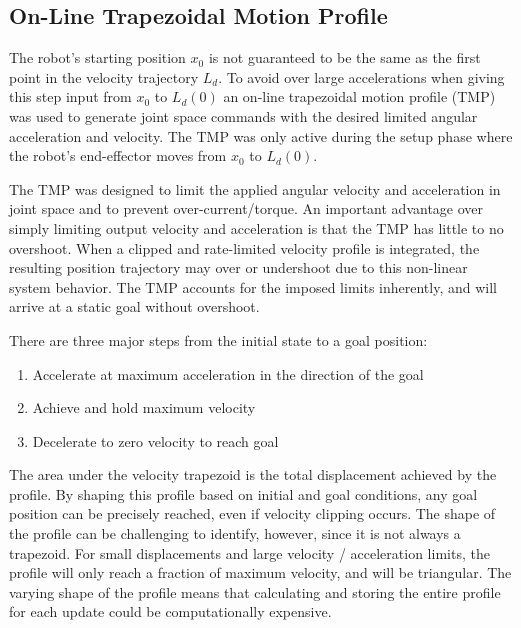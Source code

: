 \subsection{On-Line Trapezoidal Motion Profile}

The robot's starting position $x_0$ is not guaranteed to be the same as the
first point in the velocity trajectory $L_d$.  To avoid over large
accelerations when giving this step input from $x_0$ to $L_d(0)$ an on-line
trapezoidal motion profile (TMP) was used to generate joint space commands with
the desired limited angular acceleration and velocity.  The TMP was only active
during the setup phase where the robot's end-effector moves from $x_0$ to
$L_d(0)$.

The TMP was designed to limit the applied angular velocity and acceleration in
joint space and to prevent over-current/torque. An important advantage over
simply limiting output velocity and acceleration is that the TMP has little to
no overshoot. When a clipped and rate-limited velocity profile is integrated,
the resulting position trajectory may over or undershoot due to this non-linear
system behavior.  The TMP accounts for the imposed limits inherently, and will
arrive at a static goal without overshoot.

There are three major steps from the initial state to a goal position:

\begin{enumerate}
\item Accelerate at maximum acceleration in the direction of the goal
\item Achieve and hold maximum velocity
\item Decelerate to zero velocity to reach goal
\end{enumerate}

The area under the velocity trapezoid is the total displacement achieved by the
profile. By shaping this profile based on initial and goal conditions, any
goal position can be precisely reached, even if velocity clipping occurs. The
shape of the profile can be challenging to identify, however, since it is not
always a trapezoid. For small displacements and large velocity / acceleration
limits, the profile will only reach a fraction of maximum velocity, and will be
triangular. The varying shape of the profile means that calculating and storing
the entire profile for each update could be computationally expensive. 


